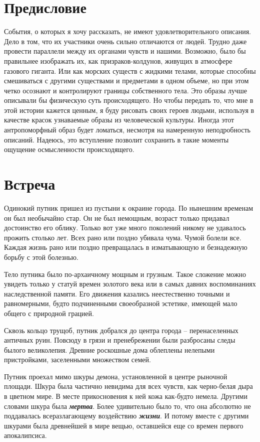 \documentclass[12pt,a4paper]{article}
\begin{document}
\section*{Предисловие}

События, о которых я хочу рассказать, не имеют удовлетворительного описания. Дело в том, что их участники очень сильно отличаются от людей. Трудно даже провести параллели между их органами чувств и нашими. Возможно, было бы правильнее изображать их, как призраков-колдунов, живущих в атмосфере газового гиганта. Или как морских существ с жидкими телами, которые способны смешиваться с другими существами и предметами в одном объеме, но при этом четко осознают и контролируют границы собственного тела. Это образы лучше описывали бы физическую суть происходящего. Но чтобы передать то, что мне в этой истории кажется ценным, я буду рисовать своих героев людьми, используя в качестве красок узнаваемые образы из человеческой культуры. Иногда этот антропоморфный образ будет ломаться, несмотря на намеренную неподробность описаний. Надеюсь, это вступление позволит сохранить в такие моменты ощущение осмысленности происходящего.

\section*{Встреча}

Одинокий путник пришел из пустыни к окраине города. По нынешним временам он был необычайно стар. Он не был немощным, возраст только придавал достоинство его облику. Только вот уже много поколений никому не удавалось прожить столько лет. Всех рано или поздно убивала чума. Чумой болели все. Каждая жизнь рано или поздно превращалась в изматывающую и безнадежную борьбу с этой болезнью.

Тело путника было по-архаичному мощным и грузным. Такое сложение можно увидеть только у статуй времен золотого века или в самых давних воспоминаниях наследственной памяти. Его движения казались неестественно точными и равномерными, будто подчиненными своеобразной эстетике, имеющей мало общего с природной грацией.

Сквозь кольцо трущоб, путник добрался до центра города -- перенаселенных античных руин. Повсюду в грязи и пренебрежении были разбросаны следы былого великолепия. Древние роскошные дома облеплены нелепыми пристройками, заселенными множеством семей.

Путник проехал мимо шкуры демона, установленной в центре рыночной площади. Шкура была частично невидима для всех чувств, как черно-белая дыра в цветном мире. В месте прикосновения к ней кожа как-будто немела. Другими словами шкура была \textbf{\textit{мертва}}. Более удивительно было то, что она абсолютно не поддавалась всеразлагающему воздействию \textbf{\textit{жизни}}. И потому вместе с другими шкурами была древнейшей в мире вещью, оставшейся еще со времен первого апокалипсиса.
\end{document}
